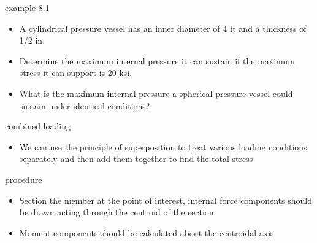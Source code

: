 \documentclass[
  letterpaper,
  ignorenonframetext,
  aspectratio=43,
  handout,
  12pt]{beamer}
\providecommand{\tightlist}{%
  \setlength{\itemsep}{0pt}\setlength{\parskip}{0pt}}
\providecommand{\tightlist}{%
\setlength{\itemsep}{0pt}\setlength{\parskip}{0pt}}
\begin{document}
\begin{frame}{example 8.1}
\protect\hypertarget{example-8.1}{}
\begin{itemize}
\tightlist
\item
  A cylindrical pressure vessel has an inner diameter of 4 ft and a
  thickness of 1/2 in.
\item
  Determine the maximum internal pressure it can sustain if the maximum
  stress it can support is 20 ksi.
\item
  What is the maximum internal pressure a spherical pressure vessel
  could sustain under identical conditions?
\end{itemize}
\end{frame}

\begin{frame}{combined loading}
\protect\hypertarget{combined-loading}{}
\begin{itemize}
\tightlist
\item
  We can use the principle of superposition to treat various loading
  conditions separately and then add them together to find the total
  stress
\end{itemize}
\end{frame}

\begin{frame}{procedure}
\protect\hypertarget{procedure}{}
\begin{itemize}
\tightlist
\item
  Section the member at the point of interest, internal force components
  should be drawn acting through the centroid of the section
\item
  Moment components should be calculated about the centroidal axis
\end{itemize}
\end{frame}
\end{document}
